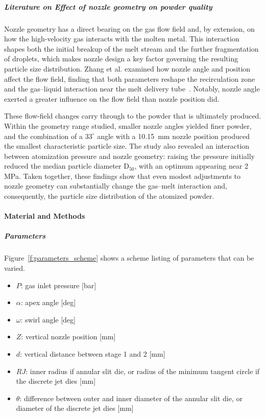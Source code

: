 \documentclass[../../../main.tex]{subfiles}
\begin{document}
\subparagraph{Literature on Effect of nozzle geometry on powder quality}

Nozzle geometry has a direct bearing on the gas flow field and, by extension, on how the high-velocity gas interacts with the molten metal. This interaction shapes both the initial breakup of the melt stream and the further fragmentation of droplets, which makes nozzle design a key factor governing the resulting particle size distribution. Zhang et al. examined how nozzle angle and position affect the flow field, finding that both parameters reshape the recirculation zone and the gas–liquid interaction near the melt delivery tube~\cite{Zhang2026NumericalAnalysis}. Notably, nozzle angle exerted a greater influence on the flow field than nozzle position did.

These flow-field changes carry through to the powder that is ultimately produced. Within the geometry range studied, smaller nozzle angles yielded finer powder, and the combination of a $33^\circ$ angle with a 10.15~mm nozzle position produced the smallest characteristic particle size. The study also revealed an interaction between atomization pressure and nozzle geometry: raising the pressure initially reduced the median particle diameter D$_{50}$, with an optimum appearing near 2 MPa. Taken together, these findings show that even modest adjustments to nozzle geometry can substantially change the gas–melt interaction and, consequently, the particle size distribution of the atomized powder.

\paragraph{Material and Methods}

\subparagraph{Parameters}

Figure~\ref{f:parameters_scheme} shows a scheme listing of parameters that can be varied.

\begin{itemize}
    \item $P$: gas inlet pressure [bar]
    \item $\alpha$: apex angle [deg]
    \item $\omega$: swirl angle [deg]
    \item $Z$: vertical nozzle position [mm]
    \item $d$: vertical distance between stage 1 and 2 [mm]
    \item $RJ$: inner radius if annular slit die, or radius of the minimum tangent circle if the discrete jet dies [mm]
    \item $\theta$: difference between outer and inner diameter of the annular slit die, or diameter of the discrete jet dies [mm]
\end{itemize}
\end{document}

